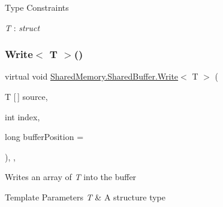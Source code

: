 \begin{Desc}
\item[Type Constraints]\begin{description}
\item[{\em T} : {\em struct}]\end{description}
\end{Desc}
\mbox{\label{class_shared_memory_1_1_shared_buffer_a70df6df643ac66849ced0ccca5f7c535}} 
\subsubsection{\texorpdfstring{Write$<$ T $>$()}{Write< T >()}\hspace{0.1cm}{\footnotesize\ttfamily [3/3]}}
{\footnotesize\ttfamily virtual void \hyperlink{class_shared_memory_1_1_shared_buffer_acbe85aa71eaf1624fa5e03c0b026fa52}{Shared\+Memory.\+Shared\+Buffer.\+Write}$<$ T $>$ (\begin{DoxyParamCaption}\item[{T \mbox{[}$\,$\mbox{]}}]{source,  }\item[{int}]{index,  }\item[{long}]{buffer\+Position = {} }\end{DoxyParamCaption})\hspace{0.3cm}{\ttfamily [inline]}, {\ttfamily [protected]}, {\ttfamily [virtual]}}



Writes an array of {\itshape T}  into the buffer 


\begin{DoxyTemplParams}{Template Parameters}
{\em T} & A structure type\\
\hline
\end{DoxyTemplParams}

